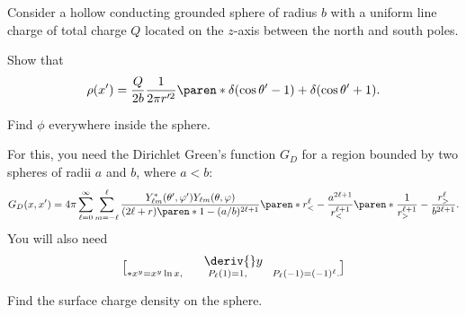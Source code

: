 \documentclass{phys151}
\begin{document}
\begin{solution}

\end{solution}

\begin{problem}
  Consider a hollow conducting grounded sphere of radius \(b\) with a uniform
  line charge of total charge \(Q\) located on the \(z\)-axis between the north
  and south poles.
  \begin{subproblems}
  \item Show that
    \[
      \rho(x') = \frac Q {2b} \frac 1 {2 \pi r'^2}
      \paren* {\delta(\cos \theta' - 1) + \delta(\cos \theta' + 1)}.
    \]
  \item Find \(\phi\) everywhere inside the sphere.
    \begin{hint}
      For this, you need the Dirichlet Green's function \(G_D\) for a region
      bounded by two spheres of radii \(a\) and \(b\), where \(a<b\):
      \[
        G_D(x, x') = 4 \pi \sum_{\ell=0}^\infty \sum_{m=-\ell}^\ell
        \frac
        {Y_{\ell m}^* (\theta', \varphi') Y_{\ell m} (\theta, \varphi)}
        {(2\ell+r) \paren* {1 - (a/b)^{2\ell+1}}}
        \paren* {r_<^\ell - \frac {a^{2\ell+1}} {r_<^{\ell+1}}}
        \paren* {\frac 1 {r_>^{\ell+1}} - \frac {r_>^\ell} {b^{2\ell+1}}}.
      \]
      You will also need
      \[
        \deriv {} y \brack* {x^y} = x^y \ln x,
        \qquad P_\ell(1) = 1,
        \qquad P_\ell(-1) = (-1)^\ell.
      \]
    \end{hint}
  \item Find the surface charge density on the sphere.
  \end{subproblems}
\end{problem}

\begin{solution}

\end{solution}
\end{document}

